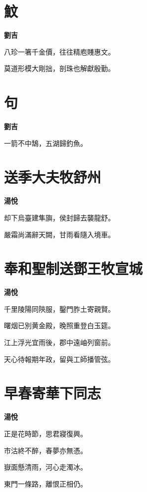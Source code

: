 \documentclass[12pt,a4paper]{ctexbook}
\begin{document}
\section{魰}
\textbf{劉吉}\par\vspace{0.5em}
八珍一箸千金價，往往精庖賤惠文。\par
莫道形模大剛拙，剖珠也解獻殷勤。\par

\section{句}
\textbf{劉吉}\par\vspace{0.5em}
一箭不中鵠，五湖歸釣魚。\par

\section{送季大夫牧舒州}
\textbf{湯悅}\par\vspace{0.5em}
却下烏臺建隼旟，侯封歸去襲龍舒。\par
嚴霜尚滿辭天闕，甘雨看隨入境車。\par

\section{奉和聖制送鄧王牧宣城}
\textbf{湯悅}\par\vspace{0.5em}
千里陵陽同陝服，鑿門胙土寄親賢。\par
曙烟已別黄金殿，晚照重登白玉筵。\par
江上浮光宜雨後，郡中遠岫列窗前。\par
天心待報期年政，留與工師播管弦。\par

\section{早春寄華下同志}
\textbf{湯悅}\par\vspace{0.5em}
正是花時節，思君寢復興。\par
市沽終不醉，春夢亦無憑。\par
嶽面懸清雨，河心走濁冰。\par
東門一條路，離恨正相仍。\par
\end{document}
